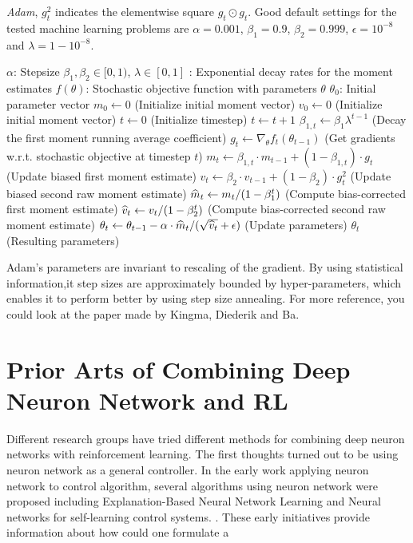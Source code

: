 \documentclass[officiallayout]{tktla}
\begin{document}
\begin{algorithm}[ht]
\caption{\emph{Adam}, $g^2_t$ indicates the elementwise square $g_t \odot g_t$. Good default settings for the tested machine learning problems are $\alpha=0.001$, $\beta_1=0.9$, $\beta_2=0.999$, $\epsilon = 10^{-8}$ and $\lambda = 1-10^{-8}$.}
\label{algo:adam}
\begin{algorithmic}[h]
\REQUIRE $\alpha$: Stepsize
\REQUIRE $\beta_1,\beta_2\in [0,1)$, $\lambda\in[0,1]$ : Exponential decay rates for the moment estimates
\REQUIRE $f(\theta)$: Stochastic objective function with parameters $\theta$
\REQUIRE $\theta_0$: Initial parameter vector
\STATE $m_0 \gets 0$ (Initialize initial  moment vector)
\STATE $v_0 \gets 0$ (Initialize initial  moment vector)
\STATE $t \gets 0$ (Initialize timestep)
\STATE $t \gets t + 1$
\STATE $\beta_{1,t} \gets \beta_1\lambda^{t-1}$ (Decay the first moment running average coefficient)
\STATE $g_t \gets \nabla_{\theta} f_t(\theta_{t-1})$ (Get gradients w.r.t. stochastic objective at timestep $t$)
\STATE $m_t \gets \beta_{1,t} \cdot m_{t-1} + (1-\beta_{1,t}) \cdot g_t$ (Update biased first moment estimate)
\STATE $v_t \gets \beta_2 \cdot v_{t-1} + (1-\beta_2) \cdot g^2_t$ (Update biased second raw moment estimate)
\STATE $\widehat{m}_t \gets m_t / (1-\beta_1^t)$ (Compute bias-corrected first moment estimate)
\STATE $\widehat{v}_t \gets v_t / (1-\beta_2^t)$ (Compute bias-corrected second raw moment estimate)
\STATE $\theta_t \gets \theta_{t-1} - \alpha \cdot \widehat{m}_t / (\sqrt{\widehat{v}_t} + \epsilon)$ (Update parameters)
\ENDWHILE
\RETURN $\theta_t$ (Resulting parameters)
\end{algorithmic}
\vspace{-0.05in}
\end{algorithm}
Adam's parameters are invariant to rescaling of the gradient. By using statistical information,it step sizes are approximately bounded by hyper-parameters, which enables it to perform better by using step size annealing. For more reference, you could look at the paper made by Kingma, Diederik and Ba\cite{kingma2014adam}.
 
\chapter{Prior Arts of Combining Deep Neuron Network and RL}
Different research groups have tried different methods for combining deep neuron networks with reinforcement learning. The first thoughts turned out to be using neuron network as a general controller. In the early work applying neuron network to control algorithm, several algorithms using neuron network were proposed including Explanation-Based Neural Network Learning\cite{thrun1996explanation} and Neural networks for self-learning control systems. \cite{nguyen1990neural}. These early initiatives provide information about how could one formulate a 
\end{document}

